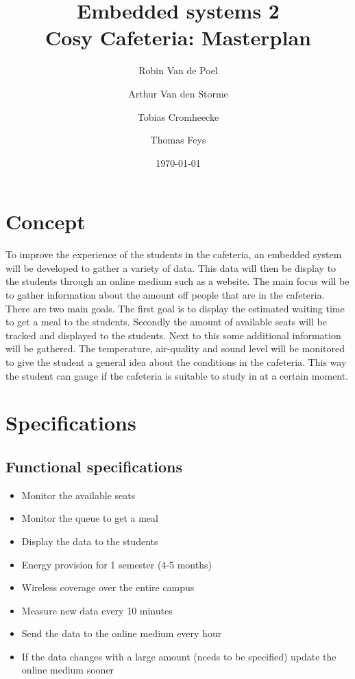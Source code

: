 \documentclass[11pt,a4paper]{article}
\begin{document}
	\title{Embedded systems 2\\
		\Huge Cosy Cafeteria: Masterplan
	}
	\author{Robin Van de Poel\and Arthur Van den Storme\and Tobias Cromheecke\and Thomas Feys}
	\date{\today}
	\maketitle
	\newpage
	
	\tableofcontents
	\newpage

	
	\section{Concept}
	To improve the experience of the students in the cafeteria, an embedded system will be developed to gather a variety of data. This data will then be display to the students through an online medium such as a website. The main focus will be to gather information about the amount off people that are in the cafeteria. There are two main goals. The first goal is to display the estimated waiting time to get a meal to the students. Secondly the amount of available seats will be tracked and displayed to the students. Next to this some additional information will be gathered. The temperature, air-quality and sound level will be monitored to give the student a general idea about the conditions in the cafeteria. This way the student can gauge if the cafeteria is suitable to study in at a certain moment.

	\section{Specifications}
	\subsection{Functional specifications}
	\begin{itemize}
		\item Monitor the available seats
		\item Monitor the queue to get a meal
		\item Display the data to the students
		\item Energy provision for 1 semester (4-5 months)
		\item Wireless coverage over the entire campus
		\item Measure new data every 10 minutes
		\item Send the data to the online medium every hour 
		\item If the data changes with a large amount (needs to be specified) update the online medium sooner
	\end{itemize}
\end{document}
